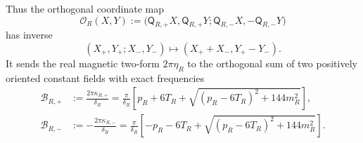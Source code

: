Thus the orthogonal coordinate map
\begin{equation}\label{eq:s6cusp-native-orthogonal-map}
 \mathscr O_R(X,Y):=
 \bigl(
 \mathsf Q_{R,+}X,\mathsf Q_{R,+}Y;
 \mathsf Q_{R,-}X,-\mathsf Q_{R,-}Y
 \bigr)
\end{equation}
has inverse
\begin{equation}\label{eq:s6cusp-native-orthogonal-inverse}
 (X_+,Y_+;X_-,Y_-)
 \longmapsto(X_++X_-,Y_+-Y_-).
\end{equation}
It sends the real magnetic two-form \(2\pi\eta_R\) to the orthogonal sum
of two positively oriented constant fields with exact frequencies
\begin{align}
 \mathcal B_{R,+}
 &:=\frac{2\pi\kappa_{R,+}}{\delta_R}
 =\frac{\pi}{\delta_R}
 \left[p_R+6T_R+
 \sqrt{(p_R-6T_R)^2+144m_R^2}\right],
 \label{eq:s6cusp-native-frequency-plus}\\
 \mathcal B_{R,-}
 &:=-\frac{2\pi\kappa_{R,-}}{\delta_R}
 =\frac{\pi}{\delta_R}
 \left[-p_R-6T_R+
 \sqrt{(p_R-6T_R)^2+144m_R^2}\right].
 \label{eq:s6cusp-native-frequency-minus}
\end{align}

